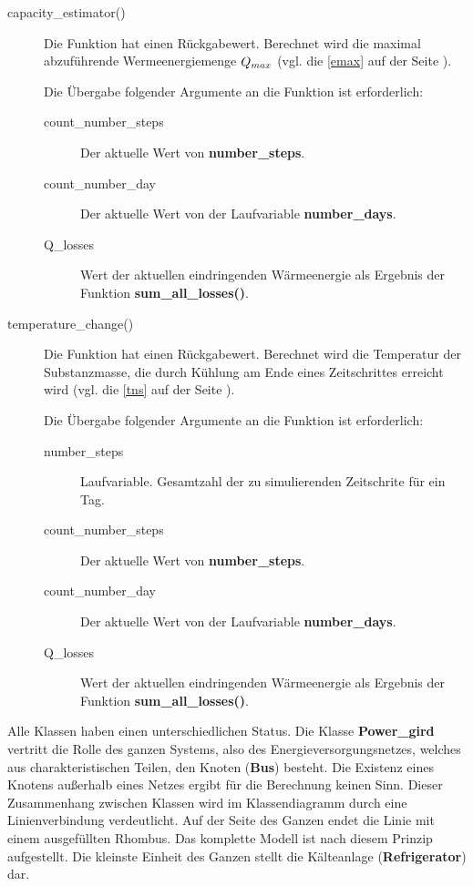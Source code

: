 \begin{description}
	\item[capacity\_estimator()] Die Funktion hat einen R\"uckgabewert.
	Berechnet wird die maximal abzuf\"uhrende Wermeenergiemenge $Q_{max}$
	(vgl. die \cref{emax} auf der Seite \pageref{emax}).

	Die \"Ubergabe folgender Argumente an die Funktion ist erforderlich:
	\begin{description}
		\item[count\_number\_steps] Der aktuelle Wert von
		\textbf{number\_steps}.
		\item[count\_number\_day] Der aktuelle Wert von der Laufvariable
		\textbf{number\_days}.
		\item[Q\_losses] Wert der aktuellen eindringenden
		W\"armeenergie als Ergebnis der Funktion
		\textbf{sum\_all\_losses()}.
	\end{description}
	\item[temperature\_change()] Die Funktion hat einen R\"uckgabewert.
	Berechnet wird die Temperatur der Substanzmasse, die durch K\"uhlung am
	Ende eines Zeitschrittes erreicht wird (vgl. die \cref{tns} auf der
	Seite \pageref{tns}).
	
	Die \"Ubergabe folgender Argumente an die Funktion ist erforderlich:
	\begin{description}
		\item[number\_steps] Laufvariable. Gesamtzahl der zu
		simulierenden Zeitschrite f\"ur ein Tag.
		\item[count\_number\_steps] Der aktuelle Wert von
		\textbf{number\_steps}.
		\item[count\_number\_day] Der aktuelle Wert von der Laufvariable
		\textbf{number\_days}.
		\item[Q\_losses] Wert der aktuellen eindringenden
		W\"armeenergie als Ergebnis der Funktion
		\textbf{sum\_all\_losses()}.
	\end{description}
\end{description}

Alle Klassen haben einen unterschiedlichen Status. Die Klasse
\textbf{Power\_gird} vertritt die Rolle des ganzen Systems, also des
Energieversorgungsnetzes, welches aus charakteristischen Teilen, den Knoten
(\textbf{Bus}) besteht. Die Existenz eines Knotens au\ss erhalb eines Netzes
ergibt f\"ur die Berechnung keinen Sinn. Dieser Zusammenhang zwischen Klassen
wird im Klassendiagramm durch eine Linienverbindung verdeutlicht. Auf der Seite
des Ganzen endet die Linie mit einem ausgef\"ullten Rhombus. Das komplette
Modell ist nach diesem Prinzip aufgestellt. Die kleinste Einheit des Ganzen
stellt die K\"alteanlage (\textbf{Refrigerator}) dar.


